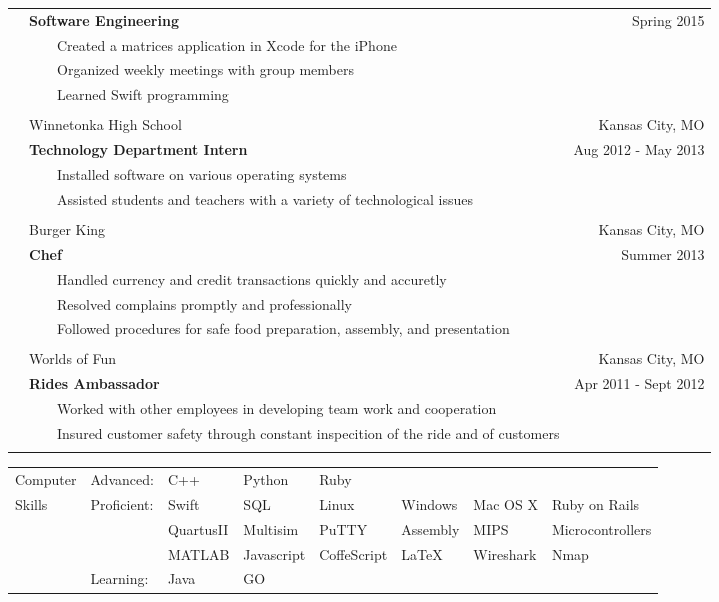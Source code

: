 \documentclass{article}
\newcommand{\tabitem}{~~\llap{\textbullet}~~}
\begin{document}
\begin{tabular}{p{1.5cm} p{12.9cm} r}
			& \textbf{Software Engineering} 									& Spring 2015 			\\
			& \tabitem Created a matrices application in Xcode for the iPhone 	& 						\\
			& \tabitem Organized weekly meetings with group members 			& 						\\
			& \tabitem Learned Swift programming 								& 						\\ \\

			& Winnetonka High School											& Kansas City, MO 		\\
			& \textbf{Technology Department Intern} 							& Aug 2012 - May 2013 	\\
			& \tabitem Installed software on various operating systems 			& 						\\
			& \tabitem Assisted students and teachers with a variety of technological issues	& 		\\ \\

			& Burger King														& Kansas City, MO 		\\
			& \textbf{Chef} 													& Summer 2013		 	\\
			& \tabitem Handled currency and credit transactions quickly and accuretly 			& 		\\
			& \tabitem Resolved complains promptly and professionally			& 						\\
			& \tabitem Followed procedures for safe food preparation, assembly, and presentation	& 	\\ \\

			& Worlds of Fun											& Kansas City, MO 					\\
			& \textbf{Rides Ambassador} 							& Apr 2011 - Sept 2012 				\\
			& \tabitem Worked with other employees in developing team work and cooperation 	& 			\\
			& \tabitem Insured customer safety through constant inspecition of the ride and of customers & \\ \\

\end{tabular}

\begin{tabular}{p{1.5cm} l l l l l l l}
Computer	& Advanced: 	& C++ 		& Python 	& Ruby		& 			& 			& 					\\
Skills		& Proficient:	& Swift 	& SQL 		& Linux 	& Windows 	& Mac OS X 	& Ruby on Rails  	\\
			&				& QuartusII & Multisim 	& PuTTY 	& Assembly 	& MIPS 		& Microcontrollers  \\
			& 				& MATLAB	& Javascript& CoffeScript& LaTeX	& Wireshark	& Nmap				\\
			& Learning:		& Java 		& GO 		& 			 & 			& 			& 					\\
\end{tabular}
\end{document}

